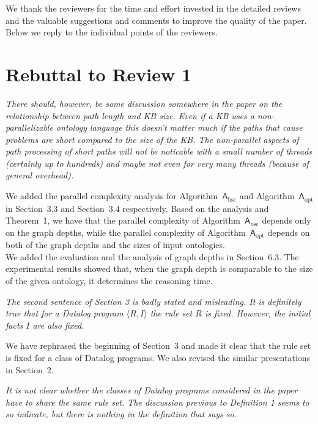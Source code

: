 \documentclass{article}
\let\quoteOld\quote
\let\endquoteOld\endquote
\renewenvironment{quote}{\quoteOld\itshape}{\endquoteOld}
\begin{document}
We thank the reviewers for the time and effort invested in the detailed reviews and the valuable suggestions and comments to improve the quality of the paper.  Below we reply to the individual points of the reviewers.


\section{Rebuttal to Review 1}

\begin{quote}
There should, however, be some discussion somewhere in the paper on the
relationship between path length and KB size.   Even if a KB uses a
non-parallelizable ontology language this doesn't matter much if the paths
that cause problems are short compared to the size of the KB.  The
non-parallel aspects of path processing of short paths will not be noticable
with a small number of threads (certainly up to hundreds) and maybe not even
for very many threads (because of general overhead).
\end{quote}

We added the parallel complexity analysis for Algorithm~$\mathsf{A}_{\text{bsc}}$
and Algorithm~$\mathsf{A}_{\text{opt}}$
in Section~3.3 and Section~3.4 respectively.
Based on the analysis and Theorem~1, we have that the parallel complexity
of Algorithm~$\mathsf{A}_{\text{bsc}}$ depends only on the graph depths,
while the parallel complexity of Algorithm~$\mathsf{A}_{\text{opt}}$
depends on both of the graph depths and the sizes of input ontologies.\\

We added the evaluation and the analysis of graph depths in Section~6.3.
The experimental results showed that, when the graph depth is comparable to
the size of the given ontology, it determines the reasoning time.


\begin{quote}
  The second sentence of Section 3 is badly stated and misleading.  It is definitely true that for a Datalog program $\langle R, I \rangle$ the rule set $R$ is fixed.  However, the initial facts $I$ are also fixed.
\end{quote}

We have rephrased the beginning of Section~3 and made it clear that the rule set is fixed for a class of Datalog programs.
We also revised the similar presentations in Section~2.

\begin{quote}
It is not clear whether the classes of Datalog programs considered in the
paper have to share the same rule set.  The discussion previous to
Definition 1 seems to so indicate, but there is nothing in the definition
that says so.
\end{quote}
\end{document}
